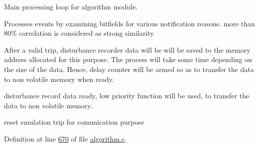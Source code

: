 Main processing loop for algorithm module. 

Processes events by examining bitfields for various notification reasons. more than 80\% correlation is considered as strong similarity

After a valid trip, disturbance recorder data will be will be saved to the memory address allocated for this purpose. The process will take some time depending on the size of the data. Hence, delay counter will be armed so as to transfer the data to non volatile memory when ready.

disturbance record data ready, low priority function will be used, to transfer the data to non volatile memory.

reset emulation trip for comunication purpose 

Definition at line \hyperlink{a00038_source_l00670}{670} of file \hyperlink{a00038_source}{algorithm.\+c}.



